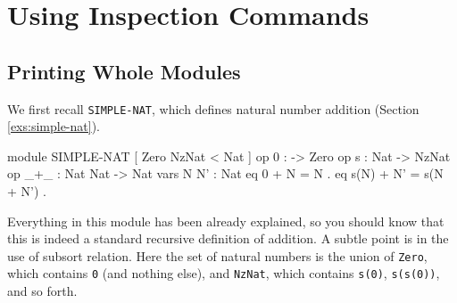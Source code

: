 \documentclass[a4paper]{memoir}
\begin{document}
\section{Using Inspection Commands}\label{sec:p2-insp-basic}

\subsection{Printing Whole Modules}\label{sec:p2-print-whole-module}

We first recall \verb|SIMPLE-NAT|, which defines natural number addition
(Section \ref{exs:simple-nat}).
\begin{vvtm}
\begin{ccode}
  module SIMPLE-NAT {
    [ Zero NzNat < Nat ]
    op 0  : -> Zero
    op s : Nat -> NzNat 
    op _+_ : Nat Nat -> Nat
    vars N N' : Nat
    eq 0 + N = N .
    eq s(N) + N' = s(N + N') .
  }
\end{ccode}
\end{vvtm}
Everything in this module has been already explained, so you should
know that this is indeed a standard recursive definition of addition.
A subtle point is in the use of subsort relation. Here the set of
natural numbers is the union of \verb|Zero|, which contains \verb|0|
(and nothing else), and \verb|NzNat|, which contains
\verb|s(0)|, \verb|s(s(0))|, and so forth.
\end{document}
